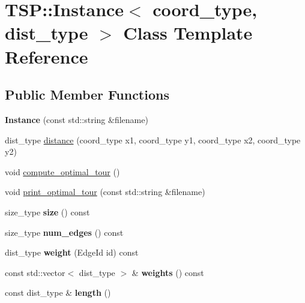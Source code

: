 \hypertarget{classTSP_1_1Instance}{}\section{T\+SP\+:\+:Instance$<$ coord\+\_\+type, dist\+\_\+type $>$ Class Template Reference}
\label{classTSP_1_1Instance}
\subsection*{Public Member Functions}
\begin{DoxyCompactItemize}
\item 
\mbox{\label{classTSP_1_1Instance_a260e73b792f15149ab5b4bb91c37dd60}} 
{\bfseries Instance} (const std\+::string \&filename)
\item 
dist\+\_\+type \hyperlink{classTSP_1_1Instance_a8d0deb55c708cc6e926b32fc298d60d1}{distance} (coord\+\_\+type x1, coord\+\_\+type y1, coord\+\_\+type x2, coord\+\_\+type y2)
\item 
void \hyperlink{classTSP_1_1Instance_a306e8ef90273445f42555d338887a9ed}{compute\+\_\+optimal\+\_\+tour} ()
\item 
void \hyperlink{classTSP_1_1Instance_a6b1774de9fe5dcdaf2da3d9ff7f0d806}{print\+\_\+optimal\+\_\+tour} (const std\+::string \&filename)
\item 
\mbox{\label{classTSP_1_1Instance_a55c16cbd3fc6c29877f8be8140e49214}} 
size\+\_\+type {\bfseries size} () const
\item 
\mbox{\label{classTSP_1_1Instance_a48b756b05b4b1af3e82e337d419eb260}} 
size\+\_\+type {\bfseries num\+\_\+edges} () const
\item 
\mbox{\label{classTSP_1_1Instance_a4781fd73dd099f14347a1d069ef63080}} 
dist\+\_\+type {\bfseries weight} (Edge\+Id id) const
\item 
\mbox{\label{classTSP_1_1Instance_af3cc1fece6c6e01b866115d633c5e38b}} 
const std\+::vector$<$ dist\+\_\+type $>$ \& {\bfseries weights} () const
\item 
\mbox{\label{classTSP_1_1Instance_a185fb93c0334531701d1bd9109a19143}} 
const dist\+\_\+type \& {\bfseries length} ()
\end{DoxyCompactItemize}


